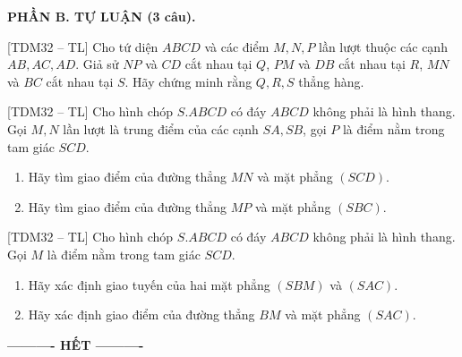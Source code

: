 \documentclass[12pt,a4paper]{article}
\newcommand{\tdm}[1]{{\small\textcolor{answerblue}{[#1]}}}
\begin{document}
\vspace{2mm}
\textbf{PHẦN B. TỰ LUẬN (3 câu).}
\begin{questions}[resume]

\item \tdm{TDM32 -- TL} Cho tứ diện $ABCD$ và các điểm $M,N,P$ lần lượt thuộc các cạnh
  $AB,AC,AD$. Giả sử $NP$ và $CD$ cắt nhau tại $Q$, $PM$ và $DB$ cắt nhau
  tại $R$, $MN$ và $BC$ cắt nhau tại $S$.
  Hãy chứng minh rằng $Q,R,S$ thẳng hàng.

\item \tdm{TDM32 -- TL} Cho hình chóp $S.ABCD$ có đáy $ABCD$ không phải là hình thang.
  Gọi $M,N$ lần lượt là trung điểm của các cạnh $SA,SB$, gọi $P$ là điểm nằm
  trong tam giác $SCD$.
  \begin{enumerate}[label=\arabic*.,leftmargin=7mm,itemsep=1pt,topsep=2pt,parsep=0pt]
  \item Hãy tìm giao điểm của đường thẳng $MN$ và mặt phẳng $(SCD)$.
  \item Hãy tìm giao điểm của đường thẳng $MP$ và mặt phẳng $(SBC)$.
  \end{enumerate}

\item \tdm{TDM32 -- TL} Cho hình chóp $S.ABCD$ có đáy $ABCD$ không phải là hình thang.
  Gọi $M$ là điểm nằm trong tam giác $SCD$.
  \begin{enumerate}[label=\arabic*.,leftmargin=7mm,itemsep=1pt,topsep=2pt,parsep=0pt]
  \item Hãy xác định giao tuyến của hai mặt phẳng $(SBM)$ và $(SAC)$.
  \item Hãy xác định giao điểm của đường thẳng $BM$ và mặt phẳng $(SAC)$.
  \end{enumerate}
\end{questions}

\vspace{3mm}
\begin{center}\textbf{---------- HẾT ----------}\end{center}
\end{document}
